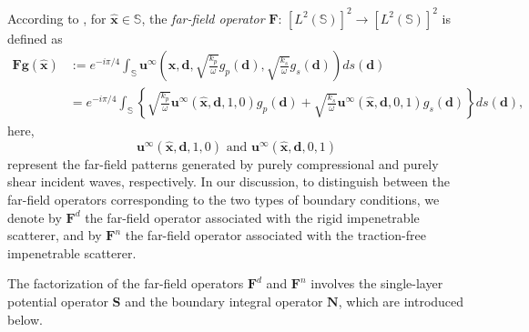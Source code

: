 \documentclass[11pt,reqno,twoside]{amsart}
\theoremstyle{definition}
\theoremstyle{remark}
\numberwithin{equation}{section}
\begin{document}
According to \cite{Aren01}, for $\hat{\mathbf x}\in \mathbb{S}$, the \emph{far-field operator} $\mathbf{F}$: $\left[L^2\left(\mathbb S\right) \right] ^2 \to \left[L^2\left(\mathbb S\right) \right] ^2$ is defined as
	\begin{equation}\begin{aligned}\label{eq:FarfieldOperator}
		\mathbf{Fg}(\hat{\mathbf x})
		 & :=e^{-i\pi /4} \int_{\mathbb S} \mathbf{u}^{\infty} \left( \hat{\mathbf x}, \mathbf d, \sqrt{\frac{k_p}{\omega}}g_p(\mathbf d),\sqrt{\frac{k_s}{\omega}}g_s(\mathbf d) \right) ds(\mathbf d)\\
		& =e^{-i\pi /4} \int_{\mathbb S}\left\lbrace \sqrt{\frac{k_p}{\omega}}\mathbf{u}^\infty (\hat{\mathbf x},\mathbf d,1,0)g_p(\mathbf d)+\sqrt{\frac{k_s}{\omega}}\mathbf{u}^\infty (\hat{\mathbf x},\mathbf d,0,1)g_s(\mathbf d)\right\rbrace ds(\mathbf d),
	\end{aligned}\end{equation}
here, 
    \begin{equation}\label{eq:far-field p s}
            \mathbf{u}^\infty(\hat{\mathbf{x}},\mathbf{d},1,0) \mbox{ and } \mathbf{u}^\infty(\hat{\mathbf{x}},\mathbf{d},0,1)
    \end{equation}
represent the far-field patterns generated by purely compressional  and purely shear incident waves, respectively. In our discussion, to distinguish between the far-field operators corresponding to the two types of boundary conditions, we denote by $\mathbf{F}^d$ the far-field operator associated with the rigid impenetrable scatterer, and by $\mathbf{F}^n$ the far-field operator associated with the traction-free impenetrable scatterer.

The factorization of the far-field operators $\mathbf{F}^d$ and $\mathbf{F}^n$ involves the single-layer potential operator $\mathbf{S}$ and the boundary integral operator $\mathbf{N}$, which are introduced below.
\end{document}
